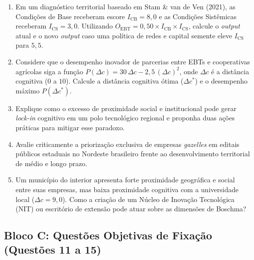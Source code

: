 \begin{enumerate}[leftmargin=1.6em, itemsep=6pt, resume]
  \item Em um diagnóstico territorial baseado em Stam \& van de Ven (2021), as Condições de Base receberam escore $I_{\text{CB}} = 8{,}0$ e as Condições Sistêmicas receberam $I_{\text{CS}} = 3{,}0$. Utilizando $O_{\text{EBT}} = 0{,}50 \times I_{\text{CB}} \times I_{\text{CS}}$, calcule o \textit{output} atual e o novo \textit{output} caso uma política de redes e capital semente eleve $I_{\text{CS}}$ para $5{,}5$.
  \espacoResolucao[2.2cm]

  \item Considere que o desempenho inovador de parcerias entre EBTs e cooperativas agrícolas siga a função $P(\Delta c) = 30\,\Delta c - 2{,}5\,(\Delta c)^2$, onde $\Delta c$ é a distância cognitiva ($0$ a $10$). Calcule a distância cognitiva ótima ($\Delta c^*$) e o desempenho máximo $P(\Delta c^*)$.
  \espacoResolucao[2.2cm]

  \item Explique como o excesso de proximidade social e institucional pode gerar \textit{lock-in} cognitivo em um polo tecnológico regional e proponha duas ações práticas para mitigar esse paradoxo.
  \espacoResolucao[2.0cm]

  \item Avalie criticamente a priorização exclusiva de empresas \textit{gazelles} em editais públicos estaduais no Nordeste brasileiro frente ao desenvolvimento territorial de médio e longo prazo.
  \espacoResolucao[2.0cm]

  \item Um município do interior apresenta forte proximidade geográfica e social entre suas empresas, mas baixa proximidade cognitiva com a universidade local ($\Delta c = 9{,}0$). Como a criação de um Núcleo de Inovação Tecnológica (NIT) ou escritório de extensão pode atuar sobre as dimensões de Boschma?
  \espacoResolucao[2.0cm]
\end{enumerate}

\subsection*{Bloco C: Questões Objetivas de Fixação (Questões 11 a 15)}

